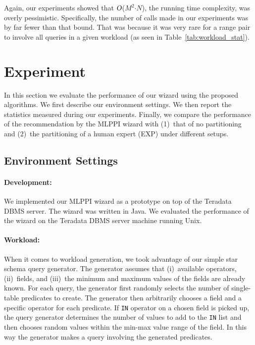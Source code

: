 \documentclass[runningheads]{comsis2}
\def\BigO{\mbox{\sl O}}
\begin{document}

Again, our experiments showed that $\BigO$($M^{2}${$\cdot$}$N$), the running time complexity, 
was overly pessimistic. Specifically, 
the number of calls made in our experiments was by far fewer than that bound. 
That was because it was very rare for a range pair to involve all queries in a given workload 
(as seen in Table~\ref{tab:workload_stat}).


\section{Experiment}
\label{sec:experiment}

In this section we evaluate the performance of our wizard using the proposed algorithms.
We first describe our environment settings. 
We then report the statistics measured during our experiments. 
Finally, we compare the performance of the recommendation 
by the MLPPI wizard with (1)~that of no partitioning 
and (2)~the partitioning of a human expert (EXP) under different setups.

\subsection{Environment Settings}
\label{sec:env_set}

\paragraph{Development:} 
We implemented our MLPPI wizard as a prototype on top of the \hbox{Teradata} DBMS server. 
The wizard was written in Java. 
We evaluated the performance of the \hbox{wizard} 
on the Teradata DBMS server machine running Unix. 

\paragraph{Workload:} When it comes to workload generation, we took advantage of 
our simple star schema query \hbox{generator}. 
The generator assumes that (i)~available operators, (ii)~fields, 
and (iii)~the minimum and \hbox{maximum} values of the fields are already known. 
For each query, the generator first randomly selects the number of single-table 
predicates to create. 
The generator then arbitrarily chooses a field and a specific operator 
for each predicate. 
If {\tt IN} operator on a chosen field is picked up, the query generator 
determines the number of values to add to the {\tt IN} list and then chooses random values within the min-max value 
range of the field. 
In this way the generator makes a query involving the generated predicates.
\end{document}
